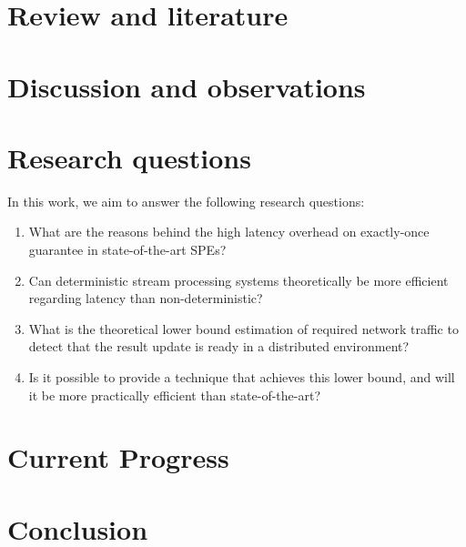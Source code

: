 \documentclass[runningheads]{llncs}
\begin{document}
\section {Review and literature}


\section {Discussion and observations}

\section {Research questions}

In this work, we aim to answer the following research questions:
\begin{enumerate}
    \item What are the reasons behind the high latency overhead on exactly-once guarantee in state-of-the-art SPEs?
    \item Can deterministic stream processing systems theoretically be more efficient regarding latency than non-deterministic? 
    \item What is the theoretical lower bound estimation of required network traffic to detect that the result update is ready in a distributed environment? 
    \item Is it possible to provide a technique that achieves this lower bound, and will it be more practically efficient than state-of-the-art? 
\end{enumerate}

\section {Current Progress}

\section {Conclusion}




\end{document}
